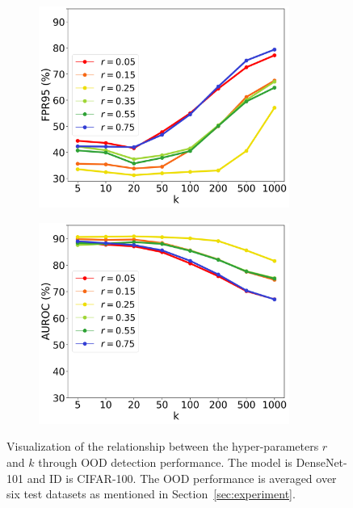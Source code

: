 \documentclass[letterpaper]{article} %
\theoremstyle{plain}
\theoremstyle{definition}
\theoremstyle{remark}
\begin{document}

\begin{figure}[h!]
\begin{subfigure}{0.5\textwidth}
  
  \includegraphics[width=0.90\textwidth]{images/ablations_NEW_FPR.png}
  \caption{}
  \label{fig:fpr}
\end{subfigure}%
\begin{subfigure}{0.5\textwidth}
  \includegraphics[width=0.90\textwidth]{images/ablations_NEW_AUROC.png}
  \caption{}
  \label{fig:auroc}
\end{subfigure}
\caption{\small Visualization of the relationship between the hyper-parameters $r$ and $k$ through OOD detection performance. The model is DenseNet-101 and ID is CIFAR-100. The OOD performance is averaged over six test datasets as mentioned in Section~\ref{sec:experiment}.} 
\label{fig:relationship}
\end{figure}
\end{document}

